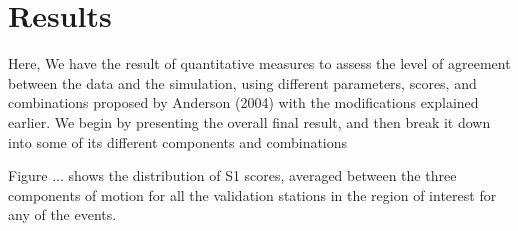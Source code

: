 
\section{Results}

Here, We have the result of quantitative measures to assess the level of agreement between the data and the simulation, using different parameters, scores, and combinations proposed by Anderson (2004) with the modifications explained earlier. We begin by presenting the overall final result, and then break it down into some of its different components and combinations

Figure ... shows the distribution of S1 scores, averaged between the three components of motion for all the validation stations in the region of interest for any of the events.
